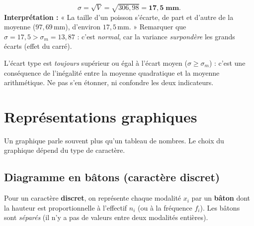 \documentclass[11pt,a4paper]{article}
\newcommand{\ecm}{\sigma_m}              %
\newcommand{\ect}{\sigma}                %
\begin{document}
\begin{exemple}
\[
\ect=\sqrt{V}=\sqrt{306{,}98}=\mathbf{17{,}5\;\text{mm}}.
\]
\textbf{Interprétation :} « La taille d'un poisson s'écarte, de part et d'autre de la moyenne
($97{,}69$\,mm), d'environ $17{,}5$\,mm. » Remarquer que $\ect=17{,}5>\ecm=13{,}87$ : c'est
\emph{normal}, car la variance \emph{surpondère} les grands écarts (effet du carré).
\end{exemple}

\begin{attention}[comparer $\ecm$ et $\ect$]
L'écart type est \emph{toujours} supérieur ou égal à l'écart moyen ($\ect\geqslant\ecm$) : c'est une
conséquence de l'inégalité entre la moyenne quadratique et la moyenne arithmétique. Ne pas s'en
étonner, ni confondre les deux indicateurs.
\end{attention}

\section{Représentations graphiques}
Un graphique parle souvent plus qu'un tableau de nombres. Le choix du graphique dépend du type de
caractère.

\subsection{Diagramme en bâtons (caractère discret)}

Pour un caractère \textbf{discret}, on représente chaque modalité $x_i$ par un \textbf{bâton} dont la
hauteur est proportionnelle à l'effectif $n_i$ (ou à la fréquence $f_i$). Les bâtons sont
\emph{séparés} (il n'y a pas de valeurs entre deux modalités entières).

\begin{center}
\end{center}
\end{document}

